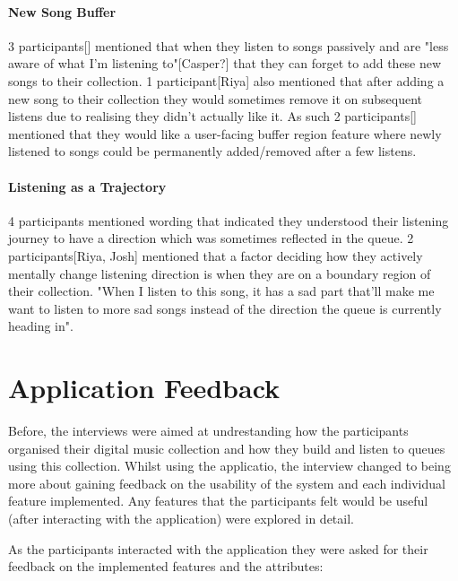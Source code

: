 \paragraph{New Song Buffer}
3 participants[] mentioned that when they listen to songs passively and are "less aware of what I'm listening to"[Casper?] that they can forget to add these new songs to their collection. 1 participant[Riya] also mentioned that after adding a new song to their collection they would sometimes remove it on subsequent listens due to realising they didn't actually like it. As such 2 participants[] mentioned that they would like a user-facing buffer region feature where newly listened to songs could be permanently added/removed after a few listens.%

\paragraph{Listening as a Trajectory}
4 participants mentioned wording that indicated they understood their listening journey to have a direction which was sometimes reflected in the queue. 2 participants[Riya, Josh] mentioned that a factor deciding how they actively mentally change listening direction is when they are on a boundary region of their collection. "When I listen to this song, it has a sad part that'll make me want to listen to more sad songs instead of the direction the queue is currently heading in".

\section{Application Feedback}
Before, the interviews were aimed at undrestanding how the participants organised their digital music collection and how they build and listen to queues using this collection. Whilst using the applicatio, the interview changed to being more about gaining feedback on the usability of the system and each individual feature implemented. Any features that the participants felt would be useful (after interacting with the application) were explored in detail.

As the participants interacted with the application they were asked for their feedback on the implemented features and the attributes:
